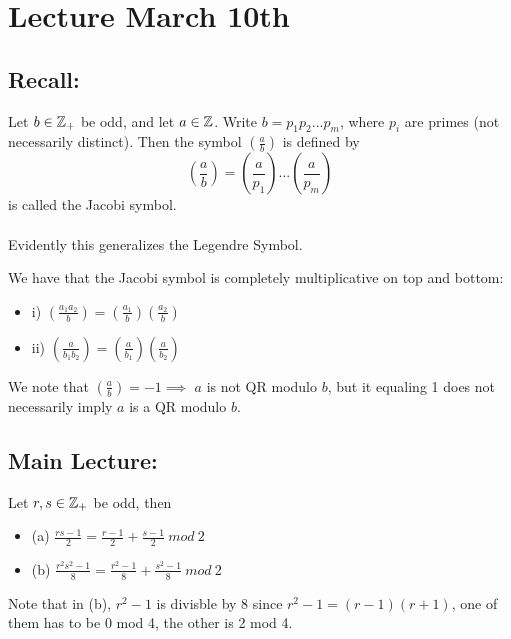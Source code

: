 \section{Lecture March 10th}

\subsection{Recall: } 

\begin{definition}
Let $b \in \mathbb{Z}_+$ be odd, and let $a \in \mathbb{Z}$. Write $b = p_1p_2...p_m$, where $p_i$ are primes (not necessarily distinct). Then the symbol $(\frac{a}{b})$ is defined by
\[(\frac{a}{b}) = (\frac{a}{p_1})...(\frac{a}{p_m})\]
is called the Jacobi symbol.\\\\
Evidently this generalizes the Legendre Symbol.
\end{definition}

\begin{proposition}
We have that the Jacobi symbol is completely multiplicative on top and bottom:
\begin{itemize}
    \item i) $(\frac{a_1a_2}{b}) = (\frac{a_1}{b})(\frac{a_2}{b})$
    \item ii) $(\frac{a}{b_1b_2}) = (\frac{a}{b_1})(\frac{a}{b_2})$
\end{itemize}
We note that $(\frac{a}{b}) = -1 \implies $ $a$ is not QR modulo $b$, but it equaling 1 does not necessarily imply $a$ is a QR modulo $b$.
\end{proposition}

\subsection{Main Lecture:}

\begin{lemma}
Let $r, s \in \mathbb{Z}_+$ be odd, then
\begin{itemize}
    \item (a) $\frac{rs - 1}{2} = \frac{r-1}{2} + \frac{s-1}{2}\ mod\ 2$
    \item (b) $\frac{r^2s^2 - 1}{8} = \frac{r^2 - 1}{8} + \frac{s^2 - 1}{8}\ mod\ 2$
\end{itemize}
Note that in (b), $r^2 - 1$ is divisble by 8 since $r^2 - 1 = (r - 1)(r + 1)$, one of them has to be 0 mod 4, the other is 2 mod 4.
\end{lemma}


